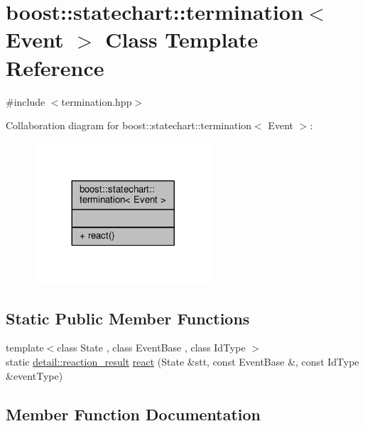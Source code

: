 \hypertarget{classboost_1_1statechart_1_1termination}{}\section{boost\+:\+:statechart\+:\+:termination$<$ Event $>$ Class Template Reference}
\label{classboost_1_1statechart_1_1termination}


{\ttfamily \#include $<$termination.\+hpp$>$}



Collaboration diagram for boost\+:\+:statechart\+:\+:termination$<$ Event $>$\+:
\nopagebreak
\begin{figure}[H]
\begin{center}
\leavevmode
\includegraphics[width=188pt]{classboost_1_1statechart_1_1termination__coll__graph}
\end{center}
\end{figure}
\subsection*{Static Public Member Functions}
\begin{DoxyCompactItemize}
\item 
{\footnotesize template$<$class State , class Event\+Base , class Id\+Type $>$ }\\static \mbox{\hyperlink{namespaceboost_1_1statechart_1_1detail_ab091bbb4c29327fb46ee479ea1b7255b}{detail\+::reaction\+\_\+result}} \mbox{\hyperlink{classboost_1_1statechart_1_1termination_a88533f0d39b8fdfa3d83b7217b55f345}{react}} (State \&stt, const Event\+Base \&, const Id\+Type \&event\+Type)
\end{DoxyCompactItemize}


\subsection{Member Function Documentation}
\mbox{\label{classboost_1_1statechart_1_1termination_a88533f0d39b8fdfa3d83b7217b55f345}} 
